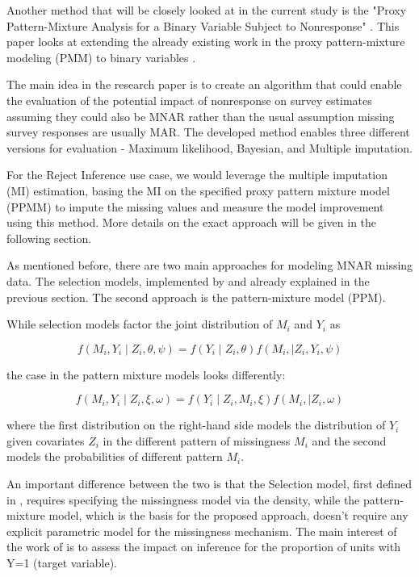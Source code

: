 \documentclass[11pt,a4paper]{article}
\begin{document}
Another method that will be closely looked at in the current study is the "Proxy Pattern-Mixture Analysis for a Binary Variable Subject to Nonresponse" \cite{Andridge_Little_2020}. This paper looks at extending the already existing work in the proxy pattern-mixture modeling (PMM) to binary variables \cite{Andridge_2011}. 

The main idea in the research paper is to create an algorithm that could enable the evaluation of the potential impact of nonresponse on survey estimates assuming they could also be MNAR rather than the usual assumption missing survey responses are usually MAR. The developed method enables three different versions for evaluation - Maximum likelihood, Bayesian, and Multiple imputation. 

For the Reject Inference use case, we would leverage the multiple imputation (MI) estimation, basing the MI on the specified proxy pattern mixture model (PPMM) to impute the missing values and measure the model improvement using this method. More details on the exact approach will be given in the following section.  


As mentioned before, there are two main approaches for modeling MNAR missing data. The selection models, implemented by \cite{galimard_heckman_2018} and already explained in the previous section. The second approach is the pattern-mixture model (PPM). 

While selection models factor the joint distribution of $M_i$ and $Y_i$ as 

$$
f\left(M_i, Y_i \mid Z_i, \theta, \psi\right)=f\left(Y_i \mid Z_i, \theta\right) f\left(M_i, \mid Z_i, Y_i, \psi\right)
$$

the case in the pattern mixture models looks differently: 

$$
f\left(M_i, Y_i \mid Z_i, \xi, \omega\right)=f\left(Y_i \mid Z_i, M_i, \xi\right) f\left(M_i, \mid Z_i, \omega\right)
$$

where the first distribution on the right-hand side models the distribution of $Y_i$ given covariates $Z_i$ in the different pattern of missingness $M_i$ and the second models the probabilities of different pattern $M_i$.

An important difference between the two is that the Selection model, first defined in \cite{heckman1976common}, requires specifying the missingness model via the density, while the pattern-mixture model, which is the basis for the proposed approach, doesn't require any explicit parametric model for the missingness mechanism. The main interest of the work of \cite{Andridge_2011} is to assess the impact on inference for the proportion of units with Y=1 (target variable). 
\end{document}

